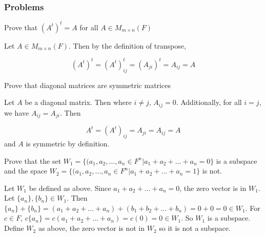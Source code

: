 \subsubsection*{Problems}


\begin{problem}
		Prove that \((A^{t})^{t} = A\) for all \(A \in M_{m\times n}(F)\)

\end{problem}


\begin{solution}
		Let \(A \in M_{m\times n}(F)\). Then by the definition of transpose,

\[
(A^{t})^{t} = (A^{t})_{ij}^{t} = (A_{ji})^{t} = A_{ij} = A
\]

\end{solution}


\begin{problem}
		Prove that diagonal matrices are symmetric matrices

\end{problem}


\begin{solution}
		Let \(A\) be a diagonal matrix. Then where \(i \not = j\), \(A_{ij} = 0\). Additionally, for all \(i = j\), we have \(A_{ij} = A_{ji}\). Then

\[
A^{t} = (A^{t})_{ij} = A_{ji} = A_{ij} = A
\]
		and \(A\) is symmetric by definition.

\end{solution}


\begin{problem}
		Prove that the set \(W_{1} = \{(a_{1}, a_{2},\dots, a_{n} \in F^{n}|a_{1} + a_{2} +\dots+ a_{n} = 0\}\) is a subspace and the space \(W_{2} = \{(a_{1}, a_{2},\dots, a_{n} \in F^{n}|a_{1} + a_{2} +\dots+ a_{n} = 1\}\) is not.

\end{problem}


\begin{solution}
		Let \(W_{1}\) be defined as above. Since \(a_{1} + a_{2} +\dots+ a_{n} = 0\), the zero vector is in \(W_{1}\). Let \(\{a_{n}\}, \{b_{n}\} \in W_{1}\). Then \(\{a_{n}\} + \{b_{n}\} = (a_{1} + a_{2} +\dots+ a_{n}) + (b_{1} + b_{2} +\dots+ b_{n}) = 0 + 0 = 0 \in W_{1}\). For \(c\in F\), \(c\{a_{n}\} = c(a_{1} + a_{2} +\dots+a_{n}) = c(0) = 0 \in W_{1}\). So \(W_{1}\) is a subspace. Define \(W_{2}\) as above, the zero vector is not in \(W_{2}\) so it is not a subspace.

\end{solution}